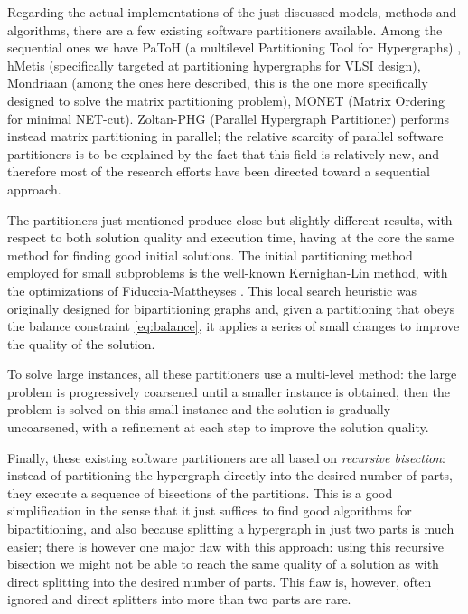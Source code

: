 Regarding the actual implementations of the just discussed models, methods and algorithms, there are a few existing software partitioners available. Among the sequential ones we have PaToH (a multilevel Partitioning Tool for Hypergraphs) \cite{patoh}, hMetis \cite{hmetis} (specifically targeted at partitioning hypergraphs for VLSI design), Mondriaan \cite{mondriaan} (among the ones here described, this is the one more specifically designed to solve the matrix partitioning problem), MONET (Matrix Ordering for minimal NET-cut)\cite{hu2000}. Zoltan-PHG (Parallel Hypergraph Partitioner) \cite{parallel_hypergraph} performs instead matrix partitioning in parallel; the relative scarcity of parallel software partitioners is to be explained by the fact that this field is relatively new, and therefore most of the research efforts have been directed toward a sequential approach.

The partitioners just mentioned produce close but slightly different results, with respect to both solution quality and execution time, having at the core the same method for finding good initial solutions. The initial partitioning method employed for small subproblems is the well-known Kernighan-Lin \cite{kernighan_lin} method, with the optimizations of Fiduccia-Mattheyses \cite{fiduccia}. This local search heuristic was originally designed for bipartitioning graphs and, given a partitioning that obeys the balance constraint \eqref{eq:balance}, it applies a series of small changes to improve the quality of the solution.

To solve large instances, all these partitioners use a multi-level method: the large problem is progressively coarsened until a smaller instance is obtained, then the problem is solved on this small instance and the solution is gradually uncoarsened, with a refinement at each step to improve the solution quality.

Finally, these existing software partitioners are all based on \emph{recursive bisection}: instead of partitioning the hypergraph directly into the desired number of parts, they execute a sequence of bisections of the partitions. This is a good simplification in the sense that it just suffices to find good algorithms for bipartitioning, and also because splitting a hypergraph in just two parts is much easier; there is however one major flaw with this approach: using this recursive bisection  we might not be able to reach the same quality of a solution as with direct splitting into the desired number of parts. This flaw is, however, often ignored and direct splitters into more than two parts are rare.

